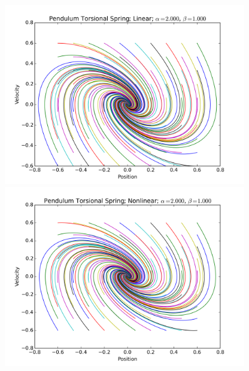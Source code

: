 \documentclass[12pt]{article}
\begin{document}
\begin{figure}[ht]
    \centering
    \includegraphics[width=400px]{figures/1_d_Pendulum_Torsional_Spring_linear}
    \includegraphics[width=400px]{figures/1_d_Pendulum_Torsional_Spring_nonlinear}
\end{figure}
\end{document}
